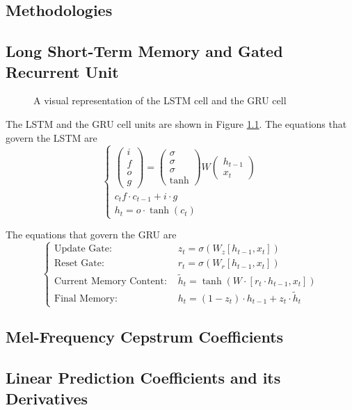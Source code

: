 \begin{appendices}
\chapter{Methodologies}
\section{Long Short-Term Memory and Gated Recurrent Unit}
\label{app:LSTM_GRU}

\begin{center}
\begin{figure}[H]
    \caption{A visual representation of the LSTM cell and the GRU cell}
    \label{app::LSTM_GRU}
\end{figure}
\end{center}

The LSTM and the GRU cell units are shown in Figure \ref{app::LSTM_GRU}. The equations that govern the LSTM are
\begin{equation*}
\begin{cases}
\begin{pmatrix} i \\ f \\ o \\ g \end{pmatrix} = \begin{pmatrix} \sigma \\ \sigma \\ \sigma \\ \tanh \end{pmatrix} W \begin{pmatrix} h_{t-1} \\ x_t \end{pmatrix} \\
c_t f \cdot c_{t-1} + i \cdot g \\
h_t = o \cdot \tanh(c_t)
\end{cases}
\end{equation*}

The equations that govern the GRU are
\begin{equation*}
\begin{cases}
\text{Update Gate: } &  z_t = \sigma(W_z [h_{t-1},x_t]) \\
\text{Reset Gate: } & r_t = \sigma(W_r[h_{t-1},x_t]) \\
\text{Current Memory Content: } & \tilde{h}_t = \tanh(W \cdot [r_t \cdot h_{t-1}, x_t]) \\
\text{Final Memory: } & h_t = (1-z_t) \cdot h_{t-1} + z_t \cdot \tilde{h}_t
\end{cases}
\end{equation*}


\section{Mel-Frequency Cepstrum Coefficients}
\section{Linear Prediction Coefficients and its Derivatives}

\end{appendices}
